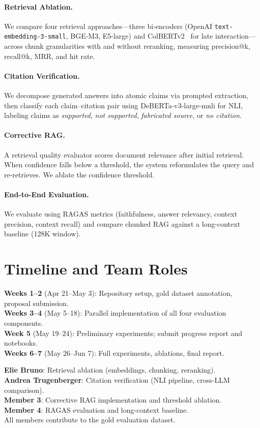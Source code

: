 \documentclass[11pt]{article}
\begin{document}
\paragraph{Retrieval Ablation.} We compare four retrieval approaches---three bi-encoders (OpenAI \texttt{text-embedding-3-small}, BGE-M3, E5-large) and ColBERTv2~\cite{santhanam2022colbertv2} for late interaction---across chunk granularities with and without reranking, measuring precision@k, recall@k, MRR, and hit rate.

\paragraph{Citation Verification.} We decompose generated answers into atomic claims via prompted extraction, then classify each claim--citation pair using DeBERTa-v3-large-mnli for NLI, labeling claims as \textit{supported}, \textit{not supported}, \textit{fabricated source}, or \textit{no citation}.

\paragraph{Corrective RAG.} A retrieval quality evaluator scores document relevance after initial retrieval. When confidence falls below a threshold, the system reformulates the query and re-retrieves. We ablate the confidence threshold.

\paragraph{End-to-End Evaluation.} We evaluate using RAGAS metrics (faithfulness, answer relevancy, context precision, context recall) and compare chunked RAG against a long-context baseline (128K window).

\section{Timeline and Team Roles}

\noindent\textbf{Weeks 1--2} (Apr 21--May 3): Repository setup, gold dataset annotation, proposal submission.\\
\textbf{Weeks 3--4} (May 5--18): Parallel implementation of all four evaluation components.\\
\textbf{Week 5} (May 19--24): Preliminary experiments; submit progress report and notebooks.\\
\textbf{Weeks 6--7} (May 26--Jun 7): Full experiments, ablations, final report.

\vspace{0.5em}
\noindent\textbf{Elie Bruno}: Retrieval ablation (embeddings, chunking, reranking).\\
\textbf{Andrea Trugenberger}: Citation verification (NLI pipeline, cross-LLM comparison).\\
\textbf{Member 3}: Corrective RAG implementation and threshold ablation.\\
\textbf{Member 4}: RAGAS evaluation and long-context baseline.\\
All members contribute to the gold evaluation dataset.

\newpage


\end{document}
